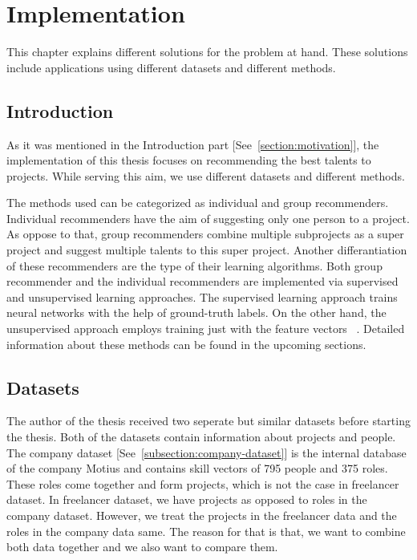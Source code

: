 
\chapter{Implementation}\label{chapter:implementation}

This chapter explains different solutions for the problem at hand. These solutions include applications using different datasets and different methods.

\section{Introduction}

As it was mentioned in the Introduction part [See~\autoref{section:motivation}], the implementation of this thesis focuses on recommending the best talents to projects. While serving this aim, we use different datasets and different methods. 


The methods used can be categorized as individual and group recommenders. Individual recommenders have the aim of suggesting only one person to a project. As oppose to that, group recommenders combine multiple subprojects as a super project and suggest multiple talents to this super project. Another differantiation of these recommenders are the type of their learning algorithms. Both group recommender and the individual recommenders are implemented via supervised and unsupervised learning approaches. The supervised learning approach trains neural networks with the help of ground-truth labels. On the other hand, the unsupervised approach employs training just with the feature vectors ~\parencite{sathya2013comparison}. Detailed information about these methods can be found in the upcoming sections. 

\section{Datasets}\label{section:datasets}

The author of the thesis received two seperate but similar datasets before starting the thesis. Both of the datasets contain information about projects and people. The company dataset [See~\autoref{subsection:company-dataset}] is the internal database of the company Motius and contains skill vectors of 795 people and 375 roles. These roles come together and form projects, which is not the case in freelancer dataset. In freelancer dataset, we have projects as opposed to roles in the company dataset. However, we treat the projects in the freelancer data and the roles in the company data same. The reason for that is that, we want to combine both data together and we also want to compare them.


